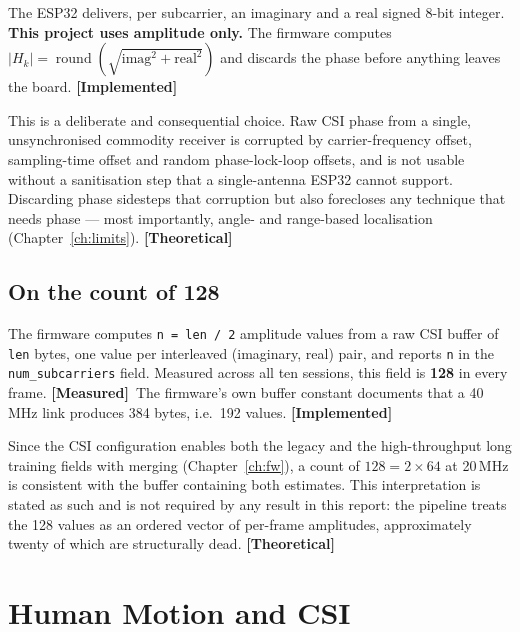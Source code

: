 \documentclass[11pt,a4paper,oneside]{report}
\newcommand{\evidencetag}[2]{{\small\sffamily\bfseries\textcolor{#1}{[#2]}}}
\newcommand{\Impl}{\evidencetag{good}{Implemented}}
\newcommand{\Meas}{\evidencetag{accent}{Measured}}
\newcommand{\Theo}{\evidencetag{warn}{Theoretical}}
\newcommand{\code}[1]{\texttt{\small #1}}
\begin{document}
The ESP32 delivers, per subcarrier, an imaginary and a real signed 8-bit
integer. \textbf{This project uses amplitude only.} The firmware computes
$|H_k| = \operatorname{round}\!\left(\sqrt{\mathrm{imag}^2 +
\mathrm{real}^2}\right)$ and discards the phase before anything leaves the
board. \Impl

This is a deliberate and consequential choice. Raw CSI phase from a single,
unsynchronised commodity receiver is corrupted by carrier-frequency offset,
sampling-time offset and random phase-lock-loop offsets, and is not usable
without a sanitisation step that a single-antenna ESP32 cannot support.
Discarding phase sidesteps that corruption but also forecloses any technique
that needs phase --- most importantly, angle- and range-based localisation
(Chapter~\ref{ch:limits}). \Theo

\subsection*{On the count of 128}

The firmware computes \code{n = len / 2} amplitude values from a raw CSI buffer
of \code{len} bytes, one value per interleaved (imaginary, real) pair, and
reports \code{n} in the \code{num\_subcarriers} field. Measured across all ten
sessions, this field is \textbf{128} in every frame. \Meas\ The firmware's own
buffer constant documents that a 40\,MHz link produces 384 bytes, i.e.\ 192
values. \Impl

Since the CSI configuration enables both the legacy and the high-throughput
long training fields with merging (Chapter~\ref{ch:fw}), a count of
$128 = 2 \times 64$ at 20\,MHz is consistent with the buffer containing both
estimates. This interpretation is stated as such and is not required by any
result in this report: the pipeline treats the 128 values as an ordered vector
of per-frame amplitudes, approximately twenty of which are structurally dead.
\Theo

\section{Human Motion and CSI}
\end{document}
